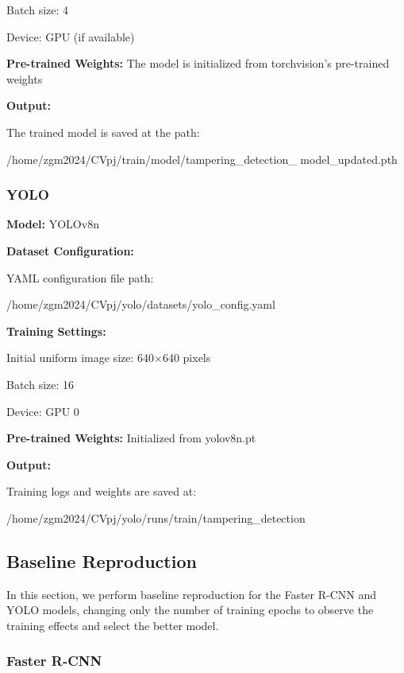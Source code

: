\noindent
Batch size: 4

\noindent
Device: GPU (if available)

\noindent
\textbf{Pre-trained Weights:} The model is initialized from torchvision's pre-trained weights

\noindent
\textbf{Output:}

\noindent
The trained model is saved at the path:

/home/zgm2024/CVpj/train/model/tampering\_detection\_
model\_updated.pth

\subsubsection{YOLO}
\noindent
\textbf{Model:} YOLOv8n

\noindent
\textbf{Dataset Configuration:}

\noindent
YAML configuration file path:

/home/zgm2024/CVpj/yolo/datasets/yolo\_config.yaml

\noindent
\textbf{Training Settings:}

\noindent
Initial uniform image size: 640$\times$640 pixels

\noindent
Batch size: 16

\noindent
Device: GPU 0

\noindent
\textbf{Pre-trained Weights:} Initialized from yolov8n.pt

\noindent
\textbf{Output:}

\noindent
Training logs and weights are saved at:

/home/zgm2024/CVpj/yolo/runs/train/tampering\_detection

\subsection{Baseline Reproduction}

In this section, we perform baseline reproduction for the Faster R-CNN and YOLO models, changing only the number of training epochs to observe the training effects and select the better model.

\subsubsection{Faster R-CNN}

